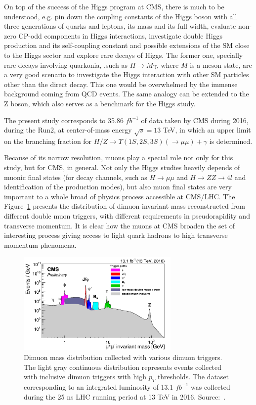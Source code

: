 On top of the success of the Higgs program at CMS, there is much to be understood, e.g. pin down the coupling constants of the Higgs boson with all three generations of quarks and leptons, its mass and its full width, evaluate non-zero CP-odd components in Higgs interactions, investigate double Higgs production and its self-coupling constant and possible extensions of the SM close to the Higgs sector and explore rare decays of Higgs. The former one, specially rare decays involving quarkonia, ,such as $H \rightarrow M \gamma$, where $M$ is a meson state, are a very good scenario to investigate the Higgs interaction with other SM particles other than the direct decay. This one would be overwhelmed by the immense background coming from QCD events. The same analogy can be extended to the Z boson, which also serves as a benchmark for the Higgs study.

The present study corresponds to 35.86 $fb^{-1}$ of data taken by CMS during 2016, during the Run2, at center-of-mass energy $\sqrt{s} = 13$ TeV, in which an upper limit on the branching fraction for $H/Z \rightarrow \Upsilon(1S, 2S, 3S) (\rightarrow \mu\mu) + \gamma $ is determined.

Because of its narrow resolution, muons play a special role not only for this study, but for CMS, in general. Not only the Higgs studies heavily depends of muonic final states (for decay channels, such as $H \rightarrow \mu\mu$ and $H \rightarrow ZZ \rightarrow 4l$ and identification of the production modes), but also muon final states are very important to a whole broad of physics process accessible at CMS/LHC. The Figure~\ref{dimuon_invariant_mass} presents the distribution of dimuon invariant mass reconstructed from different double muon triggers, with different requirements in pseudorapidity and transverse momentum. It is clear how the muons at CMS broaden the set of interesting process giving access to light quark hadrons to high transverse momentum phenomena.

\begin{figure}[htbp]
    \centering
    \includegraphics[width=0.7\textwidth]{figures_and_tables/introduction/dimuon_inv_mass.pdf}
    \caption{Dimuon mass distribution collected with various dimuon triggers. The light gray continuous distribution represents events collected with inclusive dimuon triggers with high $p_T$ thresholds. The dataset corresponding to an integrated luminosity of 13.1 $fb^{-1}$ was collected during the 25 ns LHC  running period at 13 TeV in 2016. Source:~\cite{dimuon_inv_mass}.}
    \label{dimuon_invariant_mass}
\end{figure}

